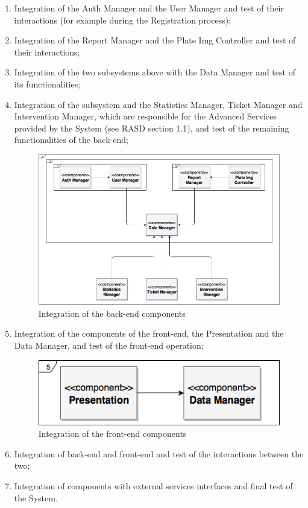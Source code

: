 \documentclass{article}
\begin{document}
\begin{enumerate}
		\item Integration of the Auth Manager and the User Manager and test of their interactions (for example during the Registration process);
		\item Integration of the Report Manager and the Plate Img Controller and test of their interactions;
		\item Integration of the two subsystems above with the Data Manager and test of its functionalities;
		\item Integration of the subsystem and the Statistics Manager, Ticket Manager and Intervention Manager, which are responsible for the Advanced Services provided by the System (see RASD section 1.1), and test of the remaining functionalities of the back-end;
			\begin{figure}[H]
			\centering
			\includegraphics[scale=0.35]{Images/Diagrams/IntegrationDiagram1.png}
			\caption{Integration of the back-end components}
	\end{figure}
		\item Integration of the components of the front-end, the Presentation and the Data Manager, and test of the front-end operation;
		\begin{figure}[H]
			\centering
			\includegraphics[scale=0.5]{Images/Diagrams/IntegrationDiagram2.png}
			\caption{Integration of the front-end components}
	\end{figure}
		\item Integration of back-end and front-end and test of the interactions between the two;
		\item Integration of components with external services interfaces and final test of the System.
	\end{enumerate}
\end{document}
